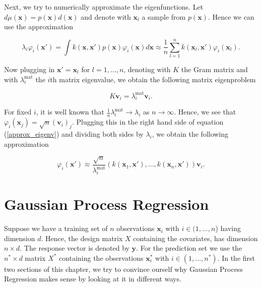 \documentclass[12pt,a4paper,oneside]{book}
\begin{document}
Next, we try to numerically approximate the eigenfunctions. Let $d \mu(\bm{x}) = p(\bm{x})d(\bm{x})$ and denote with $\bm{x}_l$ a sample from $p(\bm{x})$. Hence we can use the approximation

\begin{equation}\label{approx_eigenv}
\lambda_i \varphi_i(\bm{x}') = \int k(\bm{x},\bm{x}') p(\bm{x}) \varphi_i(\bm{x}) d\bm{x} \approx \dfrac{1}{n}  \sum_{l=1}^n k(\bm{x}_l, \bm{x}') \varphi_i(\bm{x}_l). 
\end{equation}

Now plugging in $\bm{x}' = \bm{x}_l$ for $ l = 1, \ldots, n$, denoting with $K$ the Gram matrix and with $\lambda_i^{\text{mat}}$ the $i$th matrix eigenvalue, we obtain the following matrix eigenproblem 

\begin{equation}
K \bm{v}_i = \lambda_i^{\text{mat}} \bm{v}_i .
\end{equation}

For fixed $i$, it is well known that $\frac{1}{n} \lambda_i^{\text{mat}} \rightarrow \lambda_i$ as $n \rightarrow \infty$. Hence, we see that $\varphi_i(\bm{x}_j) = \sqrt{n} (\bm{v}_i)_j$. Plugging this in the right hand side of equation (\ref{approx_eigenv}) and dividing both sides by $\lambda_i$, we obtain the following approximation  

\begin{equation}\label{approx_eigenvector}
\varphi_i(\bm{x}') \approx \dfrac{\sqrt{n}}{\lambda_i^{\text{mat}}} (k(\bm{x}_1,\bm{x}'), \ldots, k(\bm{x}_n,\bm{x}')) \bm{v}_i.
\end{equation} 

 
\chapter{Gaussian Process Regression} 

Suppose we have a training set of $n$ observations $\bm{x}_i$ with $i \in (1, \ldots,n$) having dimension $d$. Hence, the design matrix $X$ containing the covariates, has dimension $n \times d$. The response vector is denoted by $\bm{y}$. For the  prediction set we use the $n^{\ast} \times d$ matrix $X^{\ast}$ containing the observations $\bm{x}^{\ast}_i$ with $i \in (1, \ldots,n^{\ast})$. In the first two sections of this chapter, we try to convince ourself why Gaussian Process Regression makes sense by looking at it in different ways. 
\end{document}
